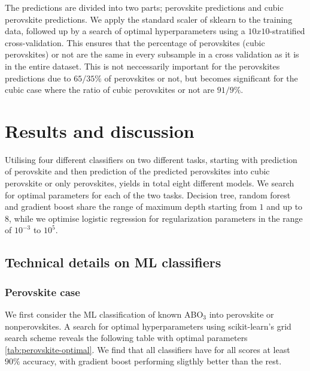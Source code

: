 

The predictions are divided into two parts; perovskite predictions and cubic perovskite predictions. We apply the standard scaler of sklearn \cite{Pedregosa2012} to the training data, followed up by a search of optimal hyperparameters using a $10x10$-stratified cross-validation. This ensures that the percentage of perovskites (cubic perovskites) or not are the same in every subsample in a cross validation as it is in the entire dataset. This is not neccessarily important for the perovskites predictions due to $65/35 \%$ of perovskites or not, but becomes significant for the cubic case where the ratio of cubic perovskites or not are $91/9\%$.

\section{Results and discussion}

Utilising four different classifiers on two different tasks, starting with prediction of perovskite and then prediction of the predicted perovskites into cubic perovskite or only perovskites, yields in total eight different models. We search for optimal parameters for each of the two tasks. Decision tree, random forest and gradient boost share the range of maximum depth starting from $1$ and up to $8$, while we optimise logistic regression for regularization parameters in the range of $10^{-3}$ to $10^5$.

\subsection{Technical details on ML classifiers}

\subsubsection{Perovskite case}
We first consider the ML classification of known ABO$_3$ into perovskite or nonperovskites. A search for optimal hyperparameters using scikit-learn's grid search scheme \cite{Pedregosa2012} reveals the following table with optimal parameters \ref{tab:perovskite-optimal}. We find that all classifiers have for all scores at least $90\%$ accuracy, with gradient boost performing sligthly better than the rest.

